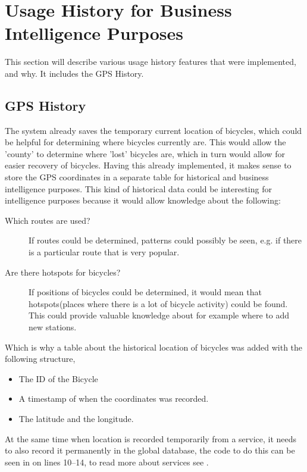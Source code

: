 \section{Usage History for Business Intelligence Purposes}
This section will describe various usage history features that were implemented, and why. It includes the GPS History.

\subsection{GPS History}
The system already saves the temporary current location of bicycles, which could be helpful for determining where bicycles currently are. 
This would allow the 'county' to determine where 'lost' bicycles are, which in turn would allow for easier recovery of bicycles.
Having this already implemented, it makes sense to store the GPS coordinates in a separate table for historical and business intelligence purposes.
This kind of historical data could be interesting for intelligence purposes because it would allow knowledge about the following:

\begin{description}
\item[Which routes are used?] If routes could be determined, patterns could possibly be seen, e.g. if there is a particular route that is very popular.
\item[Are there hotspots for bicycles?] If positions of bicycles could be determined, it would mean that hotspots(places where there is a lot of bicycle activity) could be found. This could provide valuable knowledge about for example where to add new stations.
\end{description}

Which is why a table about the historical location of bicycles was added with the following structure,

\begin{itemize}
\item The ID of the Bicycle
\item A timestamp of when the coordinates was recorded.
\item The latitude and the longitude.
\end{itemize}


At the same time when location is recorded temporarily from a service, it needs to also record it permanently in the global database, the code to do this can be seen in  on lines 10--14, to read more about services see .

